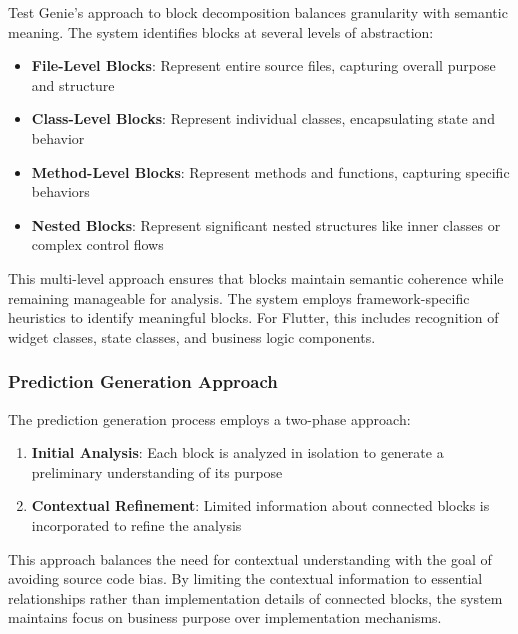 \hspace{0.5cm}Test Genie's approach to block decomposition balances granularity with semantic meaning. The system identifies blocks at several levels of abstraction:

\begin{itemize}
    \item \textbf{File-Level Blocks}: Represent entire source files, capturing overall purpose and structure
    \item \textbf{Class-Level Blocks}: Represent individual classes, encapsulating state and behavior
    \item \textbf{Method-Level Blocks}: Represent methods and functions, capturing specific behaviors
    \item \textbf{Nested Blocks}: Represent significant nested structures like inner classes or complex control flows
\end{itemize}

\hspace{0.5cm}This multi-level approach ensures that blocks maintain semantic coherence while remaining manageable for analysis. The system employs framework-specific heuristics to identify meaningful blocks. For Flutter, this includes recognition of widget classes, state classes, and business logic components.

\subsubsection{Prediction Generation Approach}

\hspace{0.5cm}The prediction generation process employs a two-phase approach:

\begin{enumerate}
    \item \textbf{Initial Analysis}: Each block is analyzed in isolation to generate a preliminary understanding of its purpose
    \item \textbf{Contextual Refinement}: Limited information about connected blocks is incorporated to refine the analysis
\end{enumerate}

\hspace{0.5cm}This approach balances the need for contextual understanding with the goal of avoiding source code bias. By limiting the contextual information to essential relationships rather than implementation details of connected blocks, the system maintains focus on business purpose over implementation mechanisms.

